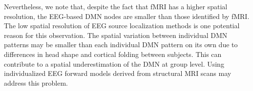 Nevertheless, we note that, despite the fact that fMRI has a higher spatial resolution, the EEG-based DMN nodes are smaller than those identified by fMRI. The low spatial resolution of EEG source localization methods is one potential reason for this observation. The spatial variation between individual DMN patterns may be smaller than each individual DMN pattern on its own due to differences in head shape and cortical folding between subjects. This can contribute to a spatial underestimation of the DMN at group level. Using individualized EEG forward models derived from structural MRI scans may address this problem.






